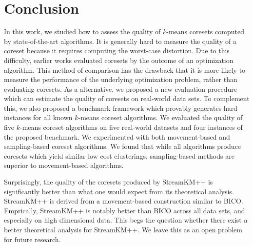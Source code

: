 \section{Conclusion} \label{sec:conclusion}
In this work, we studied how to assess the quality of $k$-means coresets computed by state-of-the-art algorithms. It is generally hard to measure the quality of a coreset because it requires computing the worst-case distortion. Due to this difficulty, earlier works evaluated coresets by the outcome of an optimization algorithm. This method of comparison has the drawback that it is more likely to measure the performance of the underlying optimization problem, rather than evaluating coresets. As a alternative, we proposed a new evaluation procedure which can estimate the quality of coresets on real-world data sets. To complement this, we also proposed a benchmark framework which provably generates hard instances for all known $k$-means coreset algorithms. We evaluated the quality of five $k$-means coreset algorithms on five real-world datasets and four instances of the proposed benchmark. We experimented with both movement-based and sampling-based coreset algorithms. We found that while all algorithms produce coresets which yield similar low cost clusterings, sampling-based methods are superior to movement-based algorithms. 

Surprisingly, the quality of the coresets produced by StreamKM++ is significantly better than what one would expect from its theoretical analysis. StreamKM++ is derived from a movement-based construction similar to BICO. Emprically, StreamKM++ is notably better than BICO across all data sets, and especially on high dimensional data. This begs the question whether there exist a better theoretical analysis for StreamKM++. We leave this as an open problem for future research.
